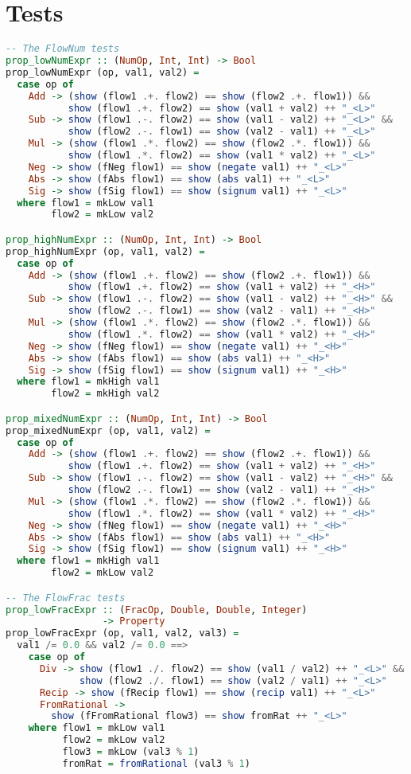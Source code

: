 \chapter{Tests}
\label{app:tests}
\begin{lstlisting}[language=Haskell]
-- The FlowNum tests
prop_lowNumExpr :: (NumOp, Int, Int) -> Bool
prop_lowNumExpr (op, val1, val2) =
  case op of
    Add -> (show (flow1 .+. flow2) == show (flow2 .+. flow1)) &&
           show (flow1 .+. flow2) == show (val1 + val2) ++ "_<L>"
    Sub -> show (flow1 .-. flow2) == show (val1 - val2) ++ "_<L>" &&
           show (flow2 .-. flow1) == show (val2 - val1) ++ "_<L>"
    Mul -> (show (flow1 .*. flow2) == show (flow2 .*. flow1)) &&
           show (flow1 .*. flow2) == show (val1 * val2) ++ "_<L>"
    Neg -> show (fNeg flow1) == show (negate val1) ++ "_<L>"
    Abs -> show (fAbs flow1) == show (abs val1) ++ "_<L>"
    Sig -> show (fSig flow1) == show (signum val1) ++ "_<L>"
  where flow1 = mkLow val1
        flow2 = mkLow val2

prop_highNumExpr :: (NumOp, Int, Int) -> Bool
prop_highNumExpr (op, val1, val2) =
  case op of
    Add -> (show (flow1 .+. flow2) == show (flow2 .+. flow1)) &&
           show (flow1 .+. flow2) == show (val1 + val2) ++ "_<H>"
    Sub -> show (flow1 .-. flow2) == show (val1 - val2) ++ "_<H>" &&
           show (flow2 .-. flow1) == show (val2 - val1) ++ "_<H>"
    Mul -> (show (flow1 .*. flow2) == show (flow2 .*. flow1)) &&
           show (flow1 .*. flow2) == show (val1 * val2) ++ "_<H>"
    Neg -> show (fNeg flow1) == show (negate val1) ++ "_<H>"
    Abs -> show (fAbs flow1) == show (abs val1) ++ "_<H>"
    Sig -> show (fSig flow1) == show (signum val1) ++ "_<H>"
  where flow1 = mkHigh val1
        flow2 = mkHigh val2

prop_mixedNumExpr :: (NumOp, Int, Int) -> Bool
prop_mixedNumExpr (op, val1, val2) =
  case op of
    Add -> (show (flow1 .+. flow2) == show (flow2 .+. flow1)) &&
           show (flow1 .+. flow2) == show (val1 + val2) ++ "_<H>"
    Sub -> show (flow1 .-. flow2) == show (val1 - val2) ++ "_<H>" &&
           show (flow2 .-. flow1) == show (val2 - val1) ++ "_<H>"
    Mul -> (show (flow1 .*. flow2) == show (flow2 .*. flow1)) &&
           show (flow1 .*. flow2) == show (val1 * val2) ++ "_<H>"
    Neg -> show (fNeg flow1) == show (negate val1) ++ "_<H>"
    Abs -> show (fAbs flow1) == show (abs val1) ++ "_<H>"
    Sig -> show (fSig flow1) == show (signum val1) ++ "_<H>"
  where flow1 = mkHigh val1
        flow2 = mkLow val2

-- The FlowFrac tests
prop_lowFracExpr :: (FracOp, Double, Double, Integer)
                 -> Property
prop_lowFracExpr (op, val1, val2, val3) =
  val1 /= 0.0 && val2 /= 0.0 ==>
    case op of
      Div -> show (flow1 ./. flow2) == show (val1 / val2) ++ "_<L>" &&
             show (flow2 ./. flow1) == show (val2 / val1) ++ "_<L>"
      Recip -> show (fRecip flow1) == show (recip val1) ++ "_<L>"
      FromRational ->
        show (fFromRational flow3) == show fromRat ++ "_<L>"
    where flow1 = mkLow val1
          flow2 = mkLow val2
          flow3 = mkLow (val3 % 1)
          fromRat = fromRational (val3 % 1)


\end{lstlisting}
